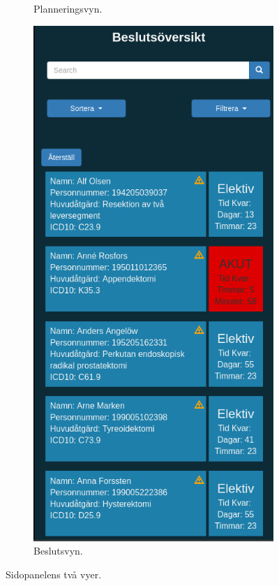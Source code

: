 \begin{figure}[H]
\begin{subfigure}[b]{0.4\linewidth}
    \caption{Planneringsvyn.}
  \end{subfigure}
  \begin{subfigure}[b]{0.4\linewidth}
    \includegraphics[width=\linewidth]{Figures/beslut.png}
    \caption{Beslutsvyn.}
  \end{subfigure}
  \caption{Sidopanelens två vyer.}
  \label{fig:sidepanel}
\end{figure}

